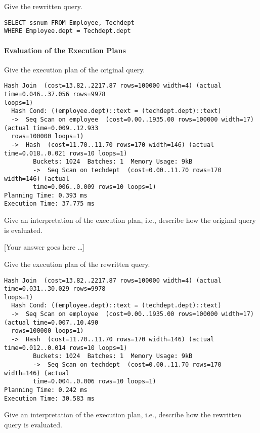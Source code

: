 \documentclass[11pt]{scrartcl}
\newcommand{\youranswerhere}{[Your answer goes here \ldots]}
\begin{document}
    Give the rewritten query.

    \begin{lstlisting}[style=dbtsql]
SELECT ssnum FROM Employee, Techdept
WHERE Employee.dept = Techdept.dept
    \end{lstlisting}

    \paragraph{Evaluation of the Execution Plans}

    Give the execution plan of the original query.

            {\small
    \parskip0pt
    \begin{verbatim}
Hash Join  (cost=13.82..2217.87 rows=100000 width=4) (actual time=0.046..37.056 rows=9978 
loops=1)
  Hash Cond: ((employee.dept)::text = (techdept.dept)::text)
  ->  Seq Scan on employee  (cost=0.00..1935.00 rows=100000 width=17) (actual time=0.009..12.933 
  rows=100000 loops=1)
  ->  Hash  (cost=11.70..11.70 rows=170 width=146) (actual time=0.018..0.021 rows=10 loops=1)
        Buckets: 1024  Batches: 1  Memory Usage: 9kB
        ->  Seq Scan on techdept  (cost=0.00..11.70 rows=170 width=146) (actual 
        time=0.006..0.009 rows=10 loops=1)
Planning Time: 0.393 ms
Execution Time: 37.775 ms
    \end{verbatim}}

    Give an interpretation of the execution plan, i.e., describe how the original query is evaluated.

    \youranswerhere{}

    Give the execution plan of the rewritten query.

            {\small
    \parskip0pt\begin{verbatim}
Hash Join  (cost=13.82..2217.87 rows=100000 width=4) (actual time=0.031..30.029 rows=9978 
loops=1)
  Hash Cond: ((employee.dept)::text = (techdept.dept)::text)
  ->  Seq Scan on employee  (cost=0.00..1935.00 rows=100000 width=17) (actual time=0.007..10.490 
  rows=100000 loops=1)
  ->  Hash  (cost=11.70..11.70 rows=170 width=146) (actual time=0.012..0.014 rows=10 loops=1)
        Buckets: 1024  Batches: 1  Memory Usage: 9kB
        ->  Seq Scan on techdept  (cost=0.00..11.70 rows=170 width=146) (actual 
        time=0.004..0.006 rows=10 loops=1)
Planning Time: 0.242 ms
Execution Time: 30.583 ms
    \end{verbatim}}

    Give an interpretation of the execution plan, i.e., describe how the rewritten query is evaluated.
\end{document}
